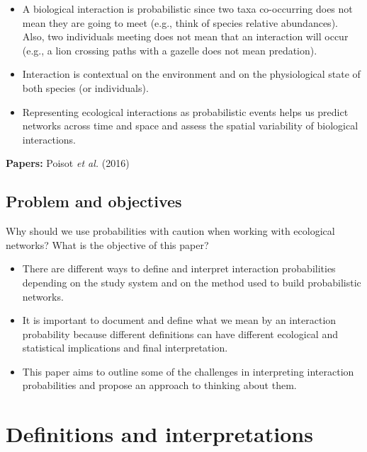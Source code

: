 \documentclass[10pt,oneside]{article}
\begin{document}
\begin{itemize}
\tightlist
\item
  A biological interaction is probabilistic since two taxa co-occurring
  does not mean they are going to meet (e.g., think of species relative
  abundances). Also, two individuals meeting does not mean that an
  interaction will occur (e.g., a lion crossing paths with a gazelle
  does not mean predation).
\item
  Interaction is contextual on the environment and on the physiological
  state of both species (or individuals).
\item
  Representing ecological interactions as probabilistic events helps us
  predict networks across time and space and assess the spatial
  variability of biological interactions.
\end{itemize}

\textbf{Papers:} Poisot \emph{et al.} (2016)

\hypertarget{problem-and-objectives}{%
\subsection{Problem and objectives}\label{problem-and-objectives}}

Why should we use probabilities with caution when working with
ecological networks? What is the objective of this paper?

\begin{itemize}
\tightlist
\item
  There are different ways to define and interpret interaction
  probabilities depending on the study system and on the method used to
  build probabilistic networks.
\item
  It is important to document and define what we mean by an interaction
  probability because different definitions can have different
  ecological and statistical implications and final interpretation.
\item
  This paper aims to outline some of the challenges in interpreting
  interaction probabilities and propose an approach to thinking about
  them.
\end{itemize}

\hypertarget{definitions-and-interpretations}{%
\section{Definitions and
interpretations}\label{definitions-and-interpretations}}
\end{document}
